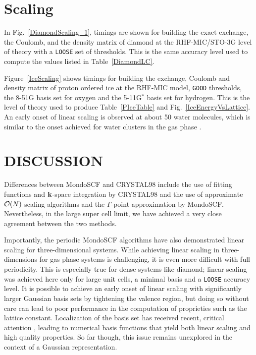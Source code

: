 \commentoutA{\documentclass[prb,aps,nobibnotes,twocolumn,doublespace,twocolumngrid,superbib,showpacs]{revtex4}}
\begin{document}
\section{Scaling}\label{scaling}

In Fig.~\ref{DiamondScaling_1}, timings are shown for building the exact exchange, the Coulomb, 
and the density matrix of diamond at the RHF-MIC/STO-3G level of theory with  a {\tt LOOSE} 
set of thresholds.  This is the same accuracy level used to compute the values listed in Table~\ref{DiamondLC}.

Figure~\ref{IceScaling} shows timings for building the  exchange, Coulomb and density matrix
of proton ordered ice \cite{SCasassa97} at the RHF-MIC model, {\tt GOOD} thresholds, the 8-51G basis 
set for oxygen and the 5-11G$^*$ basis set for hydrogen.  This is the level of theory used to
produce Table~\ref{PIceTable} and Fig.~\ref{IceEnergyVsLattice}.  An early onset of linear scaling 
is observed at about 50 water molecules, which is similar to the onset achieved for water clusters 
in the gas phase \cite{ANiklasson03}.

\section{DISCUSSION}\label{discussion}


Differences between {\sc MondoSCF} and {\sc CRYSTAL98} include the use of fitting functions and $\bf k$-space 
integration by {\sc CRYSTAL98} and the use of approximate ${\cal O}(N)$ scaling algorithms and the 
$\Gamma$-point approximation by {\sc MondoSCF}.  Nevertheless, in the large super cell limit, we have achieved a 
very close agreement between the two methods.   

Importantly, the periodic {\sc MondoSCF} algorithms have also 
demonstrated linear scaling for three-dimensional systems.  While 
achieving linear scaling in three-dimensions for gas phase systems is challenging, 
it is even more difficult with full periodicity.  This is especially true for
dense systems like diamond;  linear scaling was achieved here only for large unit cells, 
a minimal basis and a {\tt LOOSE} accuracy level.  It is possible to achieve
an early onset of linear scaling with significantly larger Gaussian basis sets by 
tightening the valence region, but doing so without care can lead to  poor 
performance in the computation of proprieties such as the lattice constant.  
Localization of the  basis set  has received recent, critical attention \cite{SKenny00,JJunquera01,EAnglada02},
leading to numerical  basis functions that yield both linear scaling and high quality properties.  So far though,
this issue remains unexplored in the context of a Gaussian representation.
\end{document}
